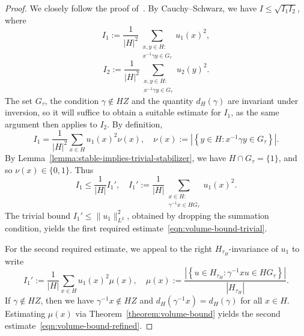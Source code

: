 \documentclass[reqno]{amsart}
\theoremstyle{plain} \newtheorem{theorem} {Theorem} \newtheorem{conjecture} {Conjecture} \newtheorem{corollary} [theorem] {Corollary} \newtheorem{proposition} [theorem] {Proposition} \newtheorem{fact} [theorem] {Fact}
\theoremstyle{definition} \newtheorem{definition} [theorem] {Definition}
\theoremstyle{itplain} %
\begin{document}
\begin{proof}
  We closely follow the proof of~\cite[Thm 15.1, Lem 15.3]{2020arXiv201202187N}.  By Cauchy--Schwarz, we have $I \leq \sqrt{I_1 I_2}$, where
  \begin{equation*}
    I_1 :=\frac{1}{\lvert H \rvert^2}
    \sum _{
      \substack{
        x, y \in H :  \\
        x ^{-1} \gamma y \in G_{\tau} 
      }
    }
    {u_1(x)}^2,
  \end{equation*}
  \begin{equation*}
    I_2 :=\frac{1}{\lvert H \rvert^2}
    \sum _{
      \substack{
        x, y \in H :  \\
        x ^{-1} \gamma y \in G_{\tau} 
      }
    }
    {u_2(y)}^2.
  \end{equation*}
  The set $G_{\tau}$, the condition $\gamma \notin H Z$ and the quantity $d_H(\gamma)$ are invariant under inversion, so it will suffice to obtain a suitable estimate for $I_1$, as the same argument then applies to $I_2$. By definition,
  \begin{equation*}
    I_1 = \frac{1}{|H|^2} \sum _{x \in H} {u_1(x)}^2 \nu(x),
    \quad
    \nu(x) := \left\lvert \left\{ y \in H : x ^{-1} \gamma y \in G_{\tau}  \right\} \right\rvert.
  \end{equation*}
  By Lemma~\ref{lemma:stable-implies-trivial-stabilizer}, we have $H \cap G_{\tau} = \{1\}$, and so $\nu(x) \in \{0, 1\}$.  Thus
  \begin{equation*}
    I_1 \leq \frac{1}{|H|} I_1', \quad
    I_1' := \frac{1}{|H|} \sum _{
      \substack{
        x \in H :  \\
        \gamma ^{-1} x \in H G_{\tau}
      }
    }
    {u_1(x)}^2.
  \end{equation*}
  The trivial bound $I_1' \leq \lVert u_1 \rVert_{L^2}^2$, obtained by dropping the summation condition, yields the first required estimate~\eqref{eqn:volume-bound-trivial}.

  For the second required estimate, we appeal to the right $H_{\tau_H}$-invariance of $u_1$ to write
  \begin{equation*}
    I_1' := \frac{1}{|H|} \sum _{
      x \in H
    }
    {u_1(x)}^2
    \mu(x),
    \quad
    \mu(x) :=
    \frac{
      \left\lvert
        \left\{
          u \in H_{\tau_H} : 
          \gamma ^{-1} x u \in H G_{\tau}
        \right\}
      \right\rvert
    }{
      \left\lvert H_{\tau_H}  \right\rvert
    }.    
  \end{equation*}
  If $\gamma \notin H Z$, then we have $\gamma ^{-1} x \notin H Z$ and $d_H(\gamma^{-1} x) = d_H(\gamma)$ for all $x \in H$.  Estimating $\mu(x)$ via Theorem~\ref{theorem:volume-bound} yields the second estimate~\eqref{eqn:volume-bound-refined}.
\end{proof}
\end{document}
